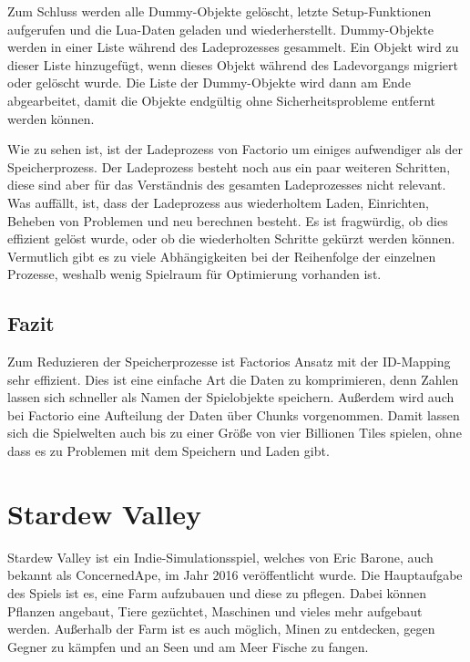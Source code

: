 Zum Schluss werden alle Dummy-Objekte gelöscht, letzte Setup-Funktionen aufgerufen und die Lua-Daten geladen und wiederherstellt. Dummy-Objekte werden in einer Liste während des Ladeprozesses gesammelt. Ein Objekt wird zu dieser Liste hinzugefügt, wenn dieses Objekt während des Ladevorgangs migriert oder gelöscht wurde. Die Liste der Dummy-Objekte wird dann am Ende abgearbeitet, damit die Objekte endgültig ohne Sicherheitsprobleme entfernt werden können.\cite{factorioGithubSaveLoad}

Wie zu sehen ist, ist der Ladeprozess von Factorio um einiges aufwendiger als der Speicherprozess. Der Ladeprozess besteht noch aus ein paar weiteren Schritten, diese sind aber für das Verständnis des gesamten Ladeprozesses nicht relevant. Was auffällt, ist, dass der Ladeprozess aus wiederholtem Laden, Einrichten, Beheben von Problemen und neu berechnen besteht. Es ist fragwürdig, ob dies effizient gelöst wurde, oder ob die wiederholten Schritte gekürzt werden können. Vermutlich gibt es zu viele Abhängigkeiten bei der Reihenfolge der einzelnen Prozesse, weshalb wenig Spielraum für Optimierung vorhanden ist.



\subsection{Fazit}
Zum Reduzieren der Speicherprozesse ist Factorios Ansatz mit der ID-Mapping sehr effizient. Dies ist eine einfache Art die Daten zu komprimieren, denn Zahlen lassen sich schneller als Namen der Spielobjekte speichern. Außerdem wird auch bei Factorio eine Aufteilung der Daten über Chunks vorgenommen. Damit lassen sich die Spielwelten auch bis zu einer Größe von vier Billionen Tiles spielen, ohne dass es zu Problemen mit dem Speichern und Laden gibt.

\newpage

\section{Stardew Valley}
Stardew Valley ist ein Indie-Simulationsspiel, welches von Eric Barone, auch bekannt als ConcernedApe, im Jahr 2016 veröffentlicht wurde. Die Hauptaufgabe des Spiels ist es, eine Farm aufzubauen und diese zu pflegen. Dabei können Pflanzen angebaut, Tiere gezüchtet, Maschinen und vieles mehr aufgebaut werden. Außerhalb der Farm ist es auch möglich, Minen zu entdecken, gegen Gegner zu kämpfen und an Seen und am Meer Fische zu fangen.\cite{steampoweredStardewValley} 

